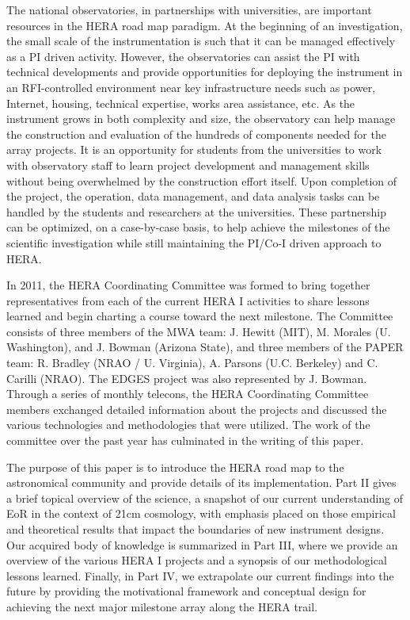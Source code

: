 The national observatories, in partnerships with universities, are
important resources in the HERA road map paradigm.  At the beginning
of an investigation, the small scale of the instrumentation is such
that it can be managed effectively as a PI driven activity. However,
the observatories can assist the PI with technical developments and
provide opportunities for deploying the instrument in an
RFI-controlled environment near key infrastructure needs such as
power, Internet, housing, technical expertise, works area assistance,
etc.  As the instrument grows in both complexity and size, the
observatory can help manage the construction and evaluation of the
hundreds of components needed for the array projects.  It is an
opportunity for students from the universities to work with
observatory staff to learn project development and management skills
without being overwhelmed by the construction effort itself.  Upon
completion of the project, the operation, data management, and data
analysis tasks can be handled by the students and researchers at the
universities.  These partnership can be optimized, on a case-by-case
basis, to help achieve the milestones of the scientific investigation
while still maintaining the PI/Co-I driven approach to HERA.

In 2011, the HERA Coordinating Committee was formed to bring together
representatives from each of the current HERA I activities to share
lessons learned and begin charting a course toward the next milestone.
The Committee consists of three members of the MWA team: J. Hewitt
(MIT), M. Morales (U. Washington), and J. Bowman (Arizona State), and
three members of the PAPER team: R. Bradley (NRAO / U. Virginia),
A. Parsons (U.C. Berkeley) and C. Carilli (NRAO).  The EDGES project
was also represented by J. Bowman. Through a series of monthly
telecons, the HERA Coordinating Committee members exchanged detailed
information about the projects and discussed the various technologies
and methodologies that were utilized.  The work of the committee over
the past year has culminated in the writing of this paper.

The purpose of this paper is to introduce the HERA road map to the
astronomical community and provide details of its implementation. Part
II gives a brief topical overview of the science, a snapshot of our
current understanding of EoR in the context of 21cm cosmology, with
emphasis placed on those empirical and theoretical results that impact
the boundaries of new instrument designs.  Our acquired body of
knowledge is summarized in Part III, where we provide an overview of
the various HERA I projects and a synopsis of our methodological
lessons learned.  Finally, in Part IV, we extrapolate our current
findings into the future by providing the motivational framework and
conceptual design for achieving the next major milestone array along
the HERA trail.
